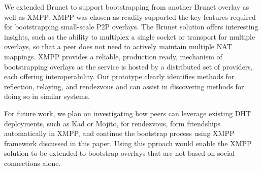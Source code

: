 \documentclass[conference]{IEEEtran}
\begin{document}
We extended Brunet to support bootstrapping from another Brunet overlay as well
as XMPP.  XMPP was chosen as readily supported the key features required for
bootstrapping small-scale P2P overlays.  The Brunet solution offers interesting
insights, such as the ability to multiplex a single socket or transport for
multiple overlays, so that a peer does not need to actively maintain multiple
NAT mappings.  XMPP provides a reliable, production ready, mechanism of
bootstrapping overlays as the service is hosted by a distributed set of
providers, each offering interoperability.  Our prototype clearly identifies
methods for reflection, relaying, and rendezvous and can assist in discovering
methods for doing so in similar systems.

For future work, we plan on investigating how peers can leverage existing DHT
deployments, such as Kad or Mojito, for rendezvous, form friendships
automatically in XMPP, and continue the bootstrap process using XMPP framework
discussed in this paper.  Using this pproach would enable the XMPP solution to
be extended to bootstrap overlays that are not based on social connections
alone.




\suppressfloats
\end{document}
